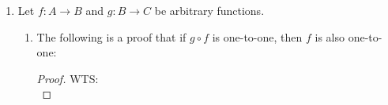 \documentclass[12pt]{article}
\theoremstyle{definition}
\newtheorem{case}{Case}
\begin{document}
\begin{enumerate}
\begin{enumerate}[i)]
\begin{proof}
            \begin{case}
            $$
            \begin{aligned}
            a & \leq 0 \\
            0<e^{a} & \leq 1 \implies 2<e^{a}+2 \leq 3 \\ 
            e^{a}+2 &\neq 1
            \end{aligned}
            $$
            \end{case}
            Since in both cases, the least value of $f_{1}(a)$ is $\neq 1$, we can conclude that \\
            $\forall a \in \mathbb{Z}, f_1(a) \neq 1$
            \end{proof}
            Next, we will prove that $f_1(a)$ is one-to-one
            \begin{proof} WTS: $\forall p, q \in \Z, f_1(p) = f_1(q) \implies p = q$ \\ 
            \begin{itemize}
                \item let $p, q \in \Z$
                \item Assume $f_1(p) = f_1(q)$
                \item WTS: $p = q$
            \end{itemize}
            \begin{align*}
                f_1(p) &= f_2(q) \\ 
                e^{p}+2 &= e^{q}+2 \\ 
                e^{p} &= e^{q} \tag{subtracting 2 from both sides} \\ 
                \ln({e^{p}}) &= \ln({e^{q}}) \tag{Taking $\ln$ of both sides} \\ 
                p \cdot \ln({e}) &= q \cdot \ln({e}) \\ 
                p &= q \tag{dividing both sides by $\ln({e})$}
            \end{align*}
            \end{proof}
        \end{enumerate}    
        \item Let $f : A \rightarrow B$ and $g : B \rightarrow C$ be arbitrary functions.
        \begin{enumerate}[i]
            \item The following is a proof that if $g \circ f$ is one-to-one, then $f$ is also one-to-one:
            \begin{proof} WTS: \\

\end{proof}
\end{enumerate}
\end{enumerate}
\end{document}
